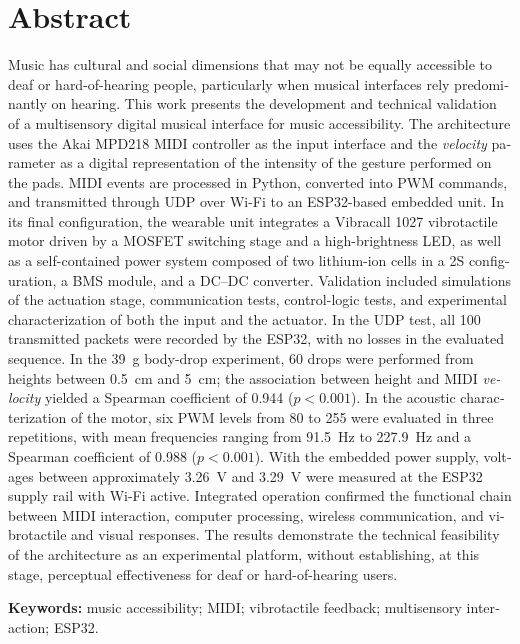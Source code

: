 \chapter*{Abstract}
\begin{otherlanguage}{english}
Music has cultural and social dimensions that may not be equally accessible to deaf or hard-of-hearing people, particularly when musical interfaces rely predominantly on hearing. This work presents the development and technical validation of a multisensory digital musical interface for music accessibility. The architecture uses the Akai MPD218 MIDI controller as the input interface and the \textit{velocity} parameter as a digital representation of the intensity of the gesture performed on the pads. MIDI events are processed in Python, converted into PWM commands, and transmitted through UDP over Wi-Fi to an ESP32-based embedded unit. In its final configuration, the wearable unit integrates a Vibracall 1027 vibrotactile motor driven by a MOSFET switching stage and a high-brightness LED, as well as a self-contained power system composed of two lithium-ion cells in a 2S configuration, a BMS module, and a DC--DC converter. Validation included simulations of the actuation stage, communication tests, control-logic tests, and experimental characterization of both the input and the actuator. In the UDP test, all 100 transmitted packets were recorded by the ESP32, with no losses in the evaluated sequence. In the 39~g body-drop experiment, 60 drops were performed from heights between 0.5~cm and 5~cm; the association between height and MIDI \textit{velocity} yielded a Spearman coefficient of 0.944 ($p<0.001$). In the acoustic characterization of the motor, six PWM levels from 80 to 255 were evaluated in three repetitions, with mean frequencies ranging from 91.5~Hz to 227.9~Hz and a Spearman coefficient of 0.988 ($p<0.001$). With the embedded power supply, voltages between approximately 3.26~V and 3.29~V were measured at the ESP32 supply rail with Wi-Fi active. Integrated operation confirmed the functional chain between MIDI interaction, computer processing, wireless communication, and vibrotactile and visual responses. The results demonstrate the technical feasibility of the architecture as an experimental platform, without establishing, at this stage, perceptual effectiveness for deaf or hard-of-hearing users.

\noindent\textbf{Keywords:} music accessibility; MIDI; vibrotactile feedback; multisensory interaction; ESP32.

\end{otherlanguage}

\clearpage

